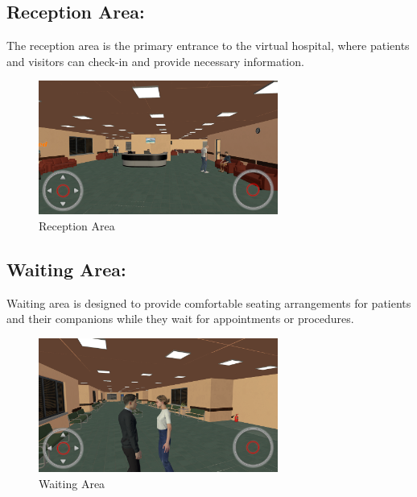 \subsection{Reception Area:}
The reception area is the primary entrance to the virtual hospital, where patients and visitors can check-in and provide necessary information.
\begin{figure}[h]
	\centering
	\includegraphics[width=0.7\textwidth, height=0.3\textheight]{Images/Reception Area.png}
	\caption{Reception Area}
	\label{fig:Reception Area}
\end{figure}
\newline

\subsection{Waiting Area:}	
Waiting area is designed to provide comfortable seating arrangements for patients and their companions while they wait for appointments or procedures.
\begin{figure}[h]
		\centering
		\includegraphics[width=0.7\textwidth, height=0.3\textheight]{Images/Waiting Area.png}
		\caption{Waiting Area}
\end{figure}
\\
